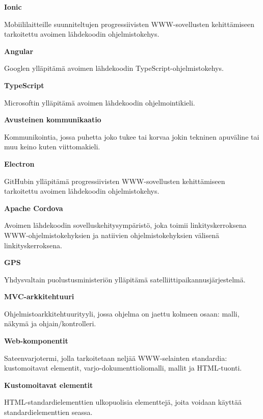 \documentclass[utf8]{gradu3}
\begin{document}
\begin{thetermlist}
\item[\textbf{Ionic}] 

Mobiililaitteille suunniteltujen progressiivisten WWW-sovellusten kehittämiseen tarkoitettu avoimen lähdekoodin ohjelmistokehys.

\item[\textbf{Angular}] 

Googlen ylläpitämä avoimen lähdekoodin TypeScript-ohjelmistokehys.

\item[\textbf{TypeScript}] 

Microsoftin ylläpitämä avoimen lähdekoodin ohjelmointikieli.

\item[\textbf{Avusteinen kommunikaatio}]

Kommunikointia, jossa puhetta joko tukee tai korvaa jokin tekninen apuväline tai muu keino kuten viittomakieli.

\item[\textbf{Electron}] 

GitHubin ylläpitämä progressiivisten WWW-sovellusten kehittämiseen tarkoitettu avoimen lähdekoodin ohjelmistokehys.

\item[\textbf{Apache Cordova}] 

Avoimen lähdekoodin sovelluskehitysympäristö, joka toimii linkityskerroksena WWW-ohjelmistokehyksien ja natiivien ohjelmistokehyksien välisenä linkityskerroksena.

\item[\textbf{GPS}] 

Yhdysvaltain puolustusministeriön ylläpitämä satelliittipaikannusjärjestelmä.

\item[\textbf{MVC-arkkitehtuuri}] 

Ohjelmistoarkkitehtuurityyli, jossa ohjelma on jaettu kolmeen osaan: malli, näkymä ja ohjain/kontrolleri.

\item[\textbf{Web-komponentit}] 

Sateenvarjotermi, jolla tarkoitetaan neljää WWW-selainten standardia: kustomoitavat elementit, varjo-dokumenttioliomalli, mallit ja HTML-tuonti.

\item[\textbf{Kustomoitavat elementit}] 

HTML-standardielementtien ulkopuolisia elementtejä, joita voidaan käyttää standardielementtien seassa.


\end{thetermlist}
\end{document}
